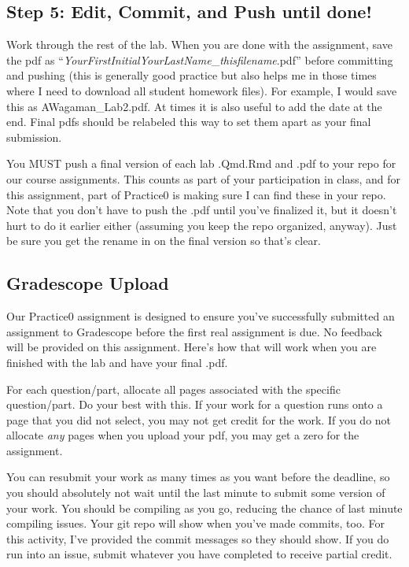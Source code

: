 \documentclass[
  letterpaper,
  DIV=11,
  numbers=noendperiod]{scrartcl}
\begin{document}
\hypertarget{step-5-edit-commit-and-push-until-done}{%
\subsection{Step 5: Edit, Commit, and Push until
done!}\label{step-5-edit-commit-and-push-until-done}}

Work through the rest of the lab. When you are done with the assignment,
save the pdf as
``\emph{YourFirstInitialYourLastName}\_\emph{thisfilename}.pdf'' before
committing and pushing (this is generally good practice but also helps
me in those times where I need to download all student homework files).
For example, I would save this as AWagaman\_Lab2.pdf. At times it is
also useful to add the date at the end. Final pdfs should be relabeled
this way to set them apart as your final submission.

You MUST push a final version of each lab .Qmd.Rmd and .pdf to your repo
for our course assignments. This counts as part of your participation in
class, and for this assignment, part of Practice0 is making sure I can
find these in your repo. Note that you don't have to push the .pdf until
you've finalized it, but it doesn't hurt to do it earlier either
(assuming you keep the repo organized, anyway). Just be sure you get the
rename in on the final version so that's clear.

\hypertarget{gradescope-upload}{%
\subsection{Gradescope Upload}\label{gradescope-upload}}

Our Practice0 assignment is designed to ensure you've successfully
submitted an assignment to Gradescope before the first real assignment
is due. No feedback will be provided on this assignment. Here's how that
will work when you are finished with the lab and have your final .pdf.

For each question/part, allocate all pages associated with the specific
question/part. Do your best with this. If your work for a question runs
onto a page that you did not select, you may not get credit for the
work. If you do not allocate \emph{any} pages when you upload your pdf,
you may get a zero for the assignment.

You can resubmit your work as many times as you want before the
deadline, so you should absolutely not wait until the last minute to
submit some version of your work. You should be compiling as you go,
reducing the chance of last minute compiling issues. Your git repo will
show when you've made commits, too. For this activity, I've provided the
commit messages so they should show. If you do run into an issue, submit
whatever you have completed to receive partial credit.
\end{document}
